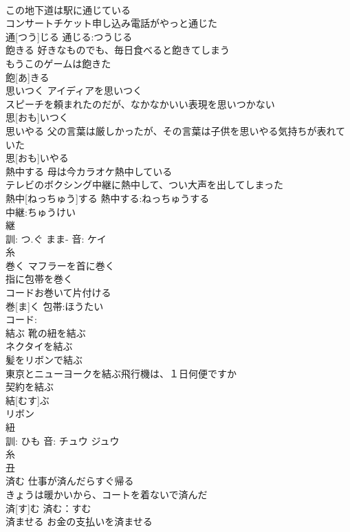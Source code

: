 \documentclass[8pt]{extreport}
\begin{document}
\begin{CJK}{UTF8}{min}
\\	この地下道は駅に通じている 
\\	コンサートチケット申し込み電話がやっと通じた 
\\	通[つう]じる			通じる:つうじる
\\	飽きる	好きなものでも、毎日食べると飽きてしまう 
\\	もうこのゲームは飽きた 
\\	飽[あ]きる						
\\	思いつく	アイディアを思いつく 
\\	スピーチを頼まれたのだが、なかなかいい表現を思いつかない 
\\	思[おも]いつく						
\\	思いやる	父の言葉は厳しかったが、その言葉は子供を思いやる気持ちが表れていた 
\\	思[おも]いやる			
\\	熱中する	母は今カラオケ熱中している 
\\	テレビのボクシング中継に熱中して、つい大声を出してしまった 
\\	熱中[ねっちゅう]する			熱中する:ねっちゅうする
\\	中継:ちゅうけい
\\	継 
\\	訓: つ.ぐ まま- 音: ケイ 
\\	糸 
\\	巻く	マフラーを首に巻く 
\\	指に包帯を巻く 
\\	コードお巻いて片付ける 
\\	巻[ま]く			包帯:ほうたい
\\	コード:
\\	結ぶ	靴の紐を結ぶ 
\\	ネクタイを結ぶ 
\\	髪をリボンで結ぶ 
\\	東京とニューヨークを結ぶ飛行機は、１日何便ですか 
\\	契約を結ぶ 
\\	結[むす]ぶ		
\\	リボン
\\	紐 
\\	訓: ひも 音: チュウ ジュウ 
\\	糸 
\\	丑 
\\	済む	仕事が済んだらすぐ帰る 
\\	きょうは暖かいから、コートを着ないで済んだ 
\\	済[す]む			済む：すむ
\\	済ませる	お金の支払いを済ませる 

\end{CJK}
\end{document}
